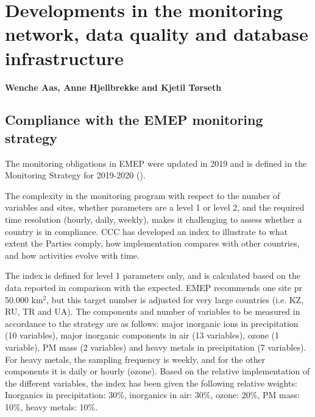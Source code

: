 \chapter[Development of measurements]{Developments in the monitoring network, data quality and database infrastructure}\label{ch:ObsDevel}

{\bf{Wenche Aas, Anne Hjellbrekke and Kjetil T{\o}rseth}}
\vspace{30pt}


\section{\label{sec:Compliance-with-monitoring}Compliance with the EMEP monitoring strategy}

The monitoring obligations in EMEP were updated in 2019 and is defined in the Monitoring Strategy for 2019-2020 (\cite{MonStrat2019}). 

The complexity in the monitoring program with respect to the number of variables and sites, whether parameters are a level 1 or level 2, and the required time resolution (hourly, daily, weekly), makes it challenging to assess whether a country is in compliance. CCC has developed an index to illustrate to what extent the Parties comply, how implementation compares with other countries, and how activities evolve with time.

The index is defined for level 1 parameters only, and is calculated based on the data reported in comparison with the expected. EMEP recommends one site pr 50.000 km$^{2}$, but this target number is adjusted for very large countries (i.e. KZ, RU, TR and UA). The components and number of variables to be measured in accordance to the strategy are as follows: major inorganic ions in precipitation (10 variables), major inorganic components in air (13 variables), ozone (1 variable), PM mass (2 variables) and heavy metals in precipitation (7 variables). For heavy metals, the sampling frequency is weekly, and for the other components it is daily or hourly (ozone). Based on the relative implementation of the different variables, the index has been given the following relative weights: Inorganics in precipitation: 30\%, inorganics in air: 30\%, ozone: 20\%, PM mass: 10\%, heavy metals: 10\%.

